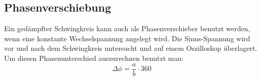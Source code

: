 \subsection{Phasenverschiebung}
Ein gedämpfter Schwingkreis kann auch als Phasenverschieber benutzt werden, wenn eine konstante Wechselspannung angelegt wird.
Die Sinus-Spannung wird vor und nach dem Schwingkreis untersucht und auf einem Oszilloskop überlagert.
Um diesen Phasenunterschied auszurechnen benutzt man:
\begin{equation}
    \Delta\phi = \frac{a}{b}\cdot360
    \label{eq:phase}
\end{equation}
